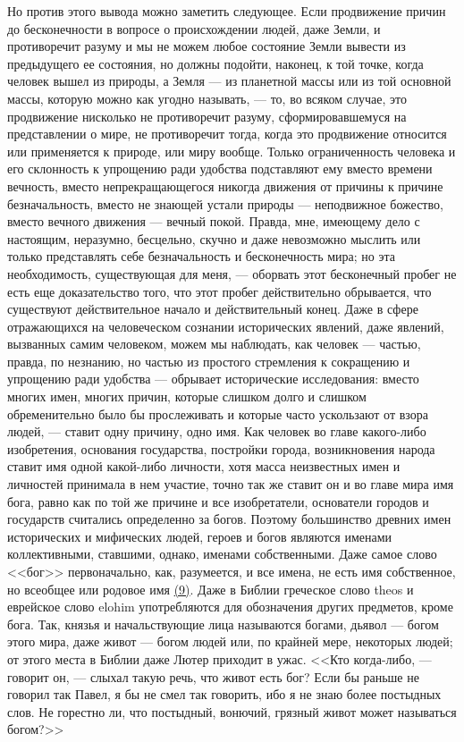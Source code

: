 \documentclass[12pt]{article}
\begin{document}
Но против этого вывода можно заметить следующее. Если продвижение причин до бесконечности в вопросе о происхождении людей, даже Земли, и противоречит разуму и мы не можем любое состояние Земли вывести из предыдущего ее состояния, но должны подойти, наконец, к той точке, когда человек вышел из природы, а Земля --- из планетной массы или из той основной массы, которую можно как угодно называть, --- то, во всяком случае, это продвижение нисколько не противоречит разуму, сформировавшемуся на представлении о мире, не противоречит тогда, когда это продвижение относится или применяется к природе, или миру вообще. Только ограниченность человека и его склонность к упрощению ради удобства подставляют ему вместо времени вечность, вместо непрекращающегося никогда движения от причины к причине безначальность, вместо не знающей устали природы --- неподвижное божество, вместо вечного движения --- вечный покой. Правда, мне, имеющему дело с настоящим, неразумно, бесцельно, скучно и даже невозможно мыслить или только представлять себе безначальность и бесконечность мира; но эта необходимость, существующая для меня, --- оборвать этот бесконечный пробег не есть еще доказательство того, что этот пробег действительно обрывается, что существуют действительное начало и действительный конец. Даже в сфере отражающихся на человеческом сознании исторических явлений, даже явлений, вызванных самим человеком, можем мы наблюдать, как человек --- частью, правда, по незнанию, но частью из простого стремления к сокращению и упрощению ради удобства --- обрывает исторические исследования: вместо многих имен, многих причин, которые слишком долго и слишком обременительно было бы прослеживать и которые часто ускользают от взора людей, --- ставит одну причину, одно имя. Как человек во главе какого-либо изобретения, основания государства, постройки города, возникновения народа ставит имя одной какой-либо личности, хотя масса неизвестных имен и личностей принимала в нем участие, точно так же ставит он и во главе мира имя бога, равно как по той же причине и все изобретатели, основатели городов и государств считались определенно за богов. Поэтому большинство древних имен исторических и мифических людей, героев и богов являются именами коллективными, ставшими, однако, именами собственными. Даже самое слово <<бог>> первоначально, как, разумеется, и все имена, не есть имя собственное, но всеобщее или родовое имя  \hyperlink{9}{(9)}\hypertarget{b9}{}. Даже в Библии греческое слово theos и еврейское слово elohim употребляются для обозначения других предметов, кроме бога. Так, князья и начальствующие лица называются богами, дьявол --- богом этого мира, даже живот --- богом людей или, по крайней мере, некоторых людей; от этого места в Библии даже Лютер приходит в ужас. <<Кто когда-либо, --- говорит он, --- слыхал такую речь, что живот есть бог? Если бы раньше не говорил так Павел, я бы не смел так говорить, ибо я не знаю более постыдных слов. Не горестно ли, что постыдный, вонючий, грязный живот может называться богом?>> 
\end{document}
